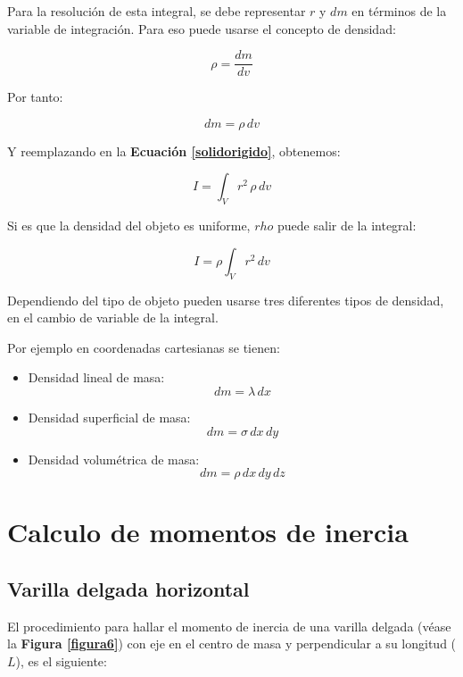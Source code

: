 \documentclass[letter,oneside,11pt]{article}
\begin{document}
Para la resolución de esta integral, se debe representar $r$ y $dm$ en términos
de la variable de integración. Para eso puede usarse el concepto de densidad:

\begin{equation}
    \rho = \frac{dm}{dv}
\label{densidad}
\end{equation}

Por tanto:

\begin{equation*}
    dm = \rho\, dv
\end{equation*}

Y reemplazando en la \textbf{Ecuación \ref{solidorigido}}, obtenemos:

\begin{equation*}
    I = \int_{V} r^2\, \rho\, dv
\end{equation*}

Si es que la densidad del objeto es uniforme, $rho$ puede salir de la integral:

\begin{equation}
    I = \rho \int_{V} r^2\, dv
\end{equation}

Dependiendo del tipo de objeto pueden usarse tres diferentes tipos de densidad,
en el cambio de variable de la integral.

Por ejemplo en coordenadas cartesianas se tienen:

\begin{itemize}
\item Densidad lineal de masa:
\begin{equation*}
    dm = \lambda\, dx
\end{equation*}

\item Densidad superficial de masa:
\begin{equation*}
    dm = \sigma\, dx\, dy
\end{equation*}

\item Densidad volumétrica de masa:
\begin{equation*}
    dm = \rho\, dx\, dy\, dz
\end{equation*}
\end{itemize}

\section{Calculo de momentos de inercia}

\subsection{Varilla delgada horizontal}
El procedimiento para hallar el momento de inercia de una varilla delgada (véase
la \textbf{Figura \ref{figura6}}) con eje en el centro de masa y perpendicular a
su longitud ($L$), es el siguiente:
\end{document}
